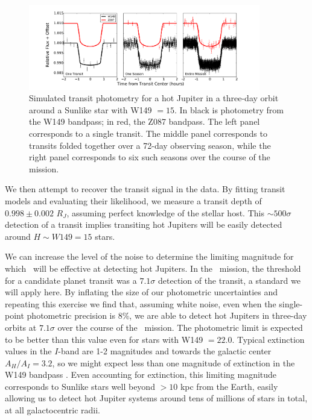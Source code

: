 \begin{figure}[htbp!]
\centerline{\includegraphics[width=0.9\textwidth]{chapter8/f2.pdf}}
\caption[Simulated transit photometry for a hot Jupiter in a three-day orbit
around a Sunlike star as observed with \WF.]{Simulated transit photometry for a hot Jupiter in a three-day orbit
around a Sunlike star with W149 $= 15$. In black is photometry from the
W149 bandpass; in red, the Z087 bandpass. The left panel corresponds to a single
transit. The middle panel corresponds to transits folded together over a 72-day
observing season, while the right panel corresponds to six such seasons over the
course of the mission.}
\label{fig:HJtrans}
\end{figure}

We then attempt to recover the transit signal in the data. By fitting transit
models and evaluating their likelihood, we measure a transit depth of
$0.998 \pm 0.002$ $R_J$, assuming perfect knowledge of the stellar host. 
This $\sim 500 \sigma$ detection of a transit implies
transiting hot Jupiters will be easily detected around $H \sim W149 = 15$ stars.

We can increase the level of the noise to determine the limiting magnitude
for which \WF\ will be effective at detecting hot Jupiters.
In the \kep\ mission, the threshold for a candidate planet transit was a $7.1\sigma$
detection of the transit, a standard we will apply here.
By inflating the size of our photometric uncertainties and repeating this exercise
we find that, assuming white noise, even when the single-point photometric precision
is 8\%, we are able to detect hot Jupiters in three-day orbits at $7.1 \sigma$ over
the course of the \WF\ mission.
The photometric limit is expected to be better than this value even
for stars with W149 $= 22.0$.
Typical extinction values in the $I$-band are 1-2 magnitudes \citep{Nataf13} and towards the 
galactic center $A_H/A_I = 3.2$, so we might expect less than one magnitude of
extinction in the W149 bandpass \citep{Nishiyama09, Nataf16}.
Even accounting for extinction, this limiting magnitude corresponds to Sunlike
stars well beyond $> 10$ kpc from the Earth, easily allowing us to detect hot Jupiter
systems around tens of millions of stars in total, at all galactocentric radii.


